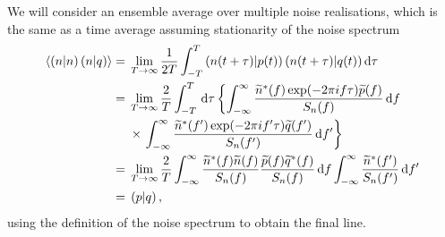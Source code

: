 We will consider an ensemble average over multiple noise realisations, which is the same as a time average assuming stationarity of the noise spectrum
\begin{align}
\left\langle\left({n}\middle|{n}\right)\left({n}\middle|{q}\right)\right\rangle = {} & \lim_{T \rightarrow \infty} \frac{1}{2T} \int_{-T}^{T}{\left({n(t+\tau)}\middle|{p(t)}\right)\left({n(t+\tau)}\middle|{q(t)}\right)}\,\mathrm{d}{\tau} \nonumber \\
 = {} & \lim_{T \rightarrow \infty} \frac{2}{T} \int_{-T}^{T}\,\mathrm{d}\tau \left\{ \int_{-\infty}^{\infty}{\frac{\widetilde{n}^\ast(f)\exp(-2\pi if\tau)\widetilde{p}(f)}{S_n(f)}}\,\mathrm{d}{f} \right. \nonumber \\
  {} & \times \left. \int_{-\infty}^{\infty}{\frac{\widetilde{n}^\ast(f')\exp(-2\pi if'\tau)\widetilde{q}(f')}{S_n(f')}}\,\mathrm{d}{f'}\right\} \nonumber \\
 = {} & \lim_{T \rightarrow \infty} \frac{2}{T} \int_{-\infty}^{\infty}{\frac{\widetilde{n}^\ast(f)\widetilde{n}(f)}{S_n(f)}\frac{\widetilde{p}(f)\widetilde{q}^\ast(f)}{S_n(f)}}\,\mathrm{d}{f}\int_{-\infty}^{\infty}{\frac{\widetilde{n}^\ast(f')}{S_n(f')}}\,\mathrm{d}{f'} \nonumber \\
 = {} & \left({p}\middle|{q}\right),
\end{align}
using the definition of the noise spectrum to obtain the final line.


